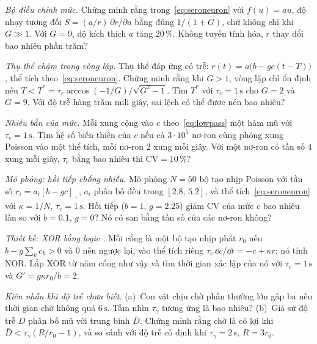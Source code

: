 \begin{exercise}[\lvlA]
\label{ex:05:2}
\emph{Bộ điều chỉnh mức.} Chứng minh rằng trong~\eqref{eq:seroneuron} với $f(u)=au$, độ nhạy tương đối $S=(a/r)\,\partial r/\partial a$ bằng đúng $1/(1+G)$, chứ không chỉ khi $G\gg1$. Với $G=9$, độ kích thích $a$ tăng $20\,\%$. Không tuyến tính hóa, $r$ thay đổi bao nhiêu phần trăm?
\end{exercise}

\begin{exercise}[\lvlB]
\label{ex:05:3}
\emph{Thụ thể chậm trong vòng lặp.} Thụ thể  đáp ứng có trễ: $r(t)=a\bigl(b-gc(t-T)\bigr)$, thể tích theo~\eqref{eq:seroneuron}. Chứng minh rằng khi $G>1$, vòng lặp chỉ ổn định nếu $T<T^*=\tau_c\arccos(-1/G)/\sqrt{G^2-1}$. Tìm $T^*$ với $\tau_c=1\,\text{s}$ cho $G=2$ và $G=9$. Với độ trễ hàng trăm mili giây, sai lệch có thể được nén bao nhiêu?
\end{exercise}

\begin{exercise}[\lvlB]
\label{ex:05:4}
\emph{Nhiễu bắn của mức.} Mỗi xung cộng vào $c$ theo~\eqref{eq:lowpass} một hàm mũ với $\tau_c=1\,\text{s}$. Tìm hệ số biến thiên của $c$ nếu cả $3\cdot10^5$ nơ-ron  cùng phóng xung Poisson vào một thể tích, mỗi nơ-ron $2$ xung mỗi giây. Với một nơ-ron có tần số $4$ xung mỗi giây, $\tau_c$ bằng bao nhiêu thì $\mathrm{CV}=10\,\%$?
\end{exercise}

\begin{exercise}[\lvlB]
\label{ex:05:5}
\emph{Mô phỏng: hồi tiếp chống nhiễu.} Mô phỏng $N=50$ bộ tạo nhịp Poisson với tần số $r_i=a_i[b-gc]_+$, $a_i$ phân bố đều trong $[2.8,\,5.2]$, và thể tích~\eqref{eq:seroneuron} với $\kappa=1/N$, $\tau_c=1\,\text{s}$. Hồi tiếp ($b=1$, $g=2.25$) giảm CV của mức $c$ bao nhiêu lần so với $b=0.1$, $g=0$? Nó có san bằng tần số của các nơ-ron không?
\end{exercise}

\begin{exercise}[\lvlB]
\label{ex:05:6}
\emph{Thiết kế: XOR bằng logic .} Mỗi cổng là một bộ tạo nhịp phát $r_0$ nếu $b-g\sum_kc_k>0$ và $0$ nếu ngược lại, vào thể tích riêng $\tau_c\,\dd c/\dd t=-c+\kappa r$; nó tính NOR. Lắp XOR từ năm cổng như vậy và tìm thời gian xác lập của nó với $\tau_c=1\,\text{s}$ và $G'=g\kappa r_0/b=2$.
\end{exercise}

\begin{exercise}[\lvlB]
\label{ex:05:7}
\emph{Kiên nhẫn khi độ trễ chưa biết.} (a)~Con vật chịu chờ phần thưởng lớn gấp ba nếu thời gian chờ không quá $6\,\text{s}$. Tầm nhìn $\tau_\gamma$ tương ứng là bao nhiêu? (b)~Giả sử độ trễ $D$ phân bố mũ với trung bình $\bar D$. Chứng minh rằng chờ là có lợi khi $\bar D<\tau_\gamma(R/r_0-1)$, và so sánh với độ trễ cố định khi $\tau_\gamma=2\,\text{s}$, $R=3r_0$.
\end{exercise}

